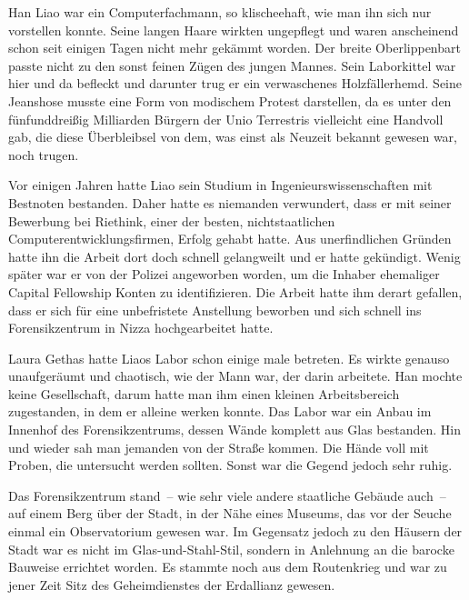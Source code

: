 Han Liao war ein Computerfachmann, so klischeehaft, wie man ihn sich nur vorstellen konnte. Seine langen Haare wirkten ungepflegt und waren anscheinend schon seit einigen Tagen nicht mehr gekämmt worden. Der breite Oberlippenbart passte nicht zu den sonst feinen Zügen des jungen Mannes. Sein Laborkittel war hier und da befleckt und darunter trug er ein verwaschenes Holzfällerhemd. Seine Jeanshose musste eine Form von modischem Protest darstellen, da es unter den fünfunddreißig Milliarden Bürgern der Unio Terrestris vielleicht eine Handvoll gab, die diese Überbleibsel von dem, was einst als Neuzeit bekannt gewesen war, noch trugen.

\par

Vor einigen Jahren hatte Liao sein Studium in Ingenieurswissenschaften mit Bestnoten bestanden. Daher hatte es niemanden verwundert, dass er mit seiner Bewerbung bei Riethink, einer der besten, nichtstaatlichen Computerentwicklungsfirmen, Erfolg gehabt hatte. Aus unerfindlichen Gründen hatte ihn die Arbeit dort doch schnell gelangweilt und er hatte gekündigt. Wenig später war er von der Polizei angeworben worden, um die Inhaber ehemaliger Capital Fellowship Konten zu identifizieren. Die Arbeit hatte ihm derart gefallen, dass er sich für eine unbefristete Anstellung beworben und sich schnell ins Forensikzentrum in Nizza hochgearbeitet hatte.

\par

Laura Gethas hatte Liaos Labor schon einige male betreten. Es wirkte genauso unaufgeräumt und chaotisch, wie der Mann war, der darin arbeitete. Han mochte keine Gesellschaft, darum hatte man ihm einen kleinen Arbeitsbereich zugestanden, in dem er alleine werken konnte. Das Labor war ein Anbau im Innenhof des Forensikzentrums, dessen Wände komplett aus Glas bestanden. Hin und wieder sah man jemanden von der Straße kommen. Die Hände voll mit Proben, die untersucht werden sollten. Sonst war die Gegend jedoch sehr ruhig.

\par

Das Forensikzentrum stand~-- wie sehr viele andere staatliche Gebäude auch~-- auf einem Berg über der Stadt, in der Nähe eines Museums, das vor der Seuche einmal ein Observatorium gewesen war. Im Gegensatz jedoch zu den Häusern der Stadt war es nicht im Glas-und-Stahl-Stil, sondern in Anlehnung an die barocke Bauweise errichtet worden. Es stammte noch aus dem Routenkrieg und war zu jener Zeit Sitz des Geheimdienstes der Erdallianz gewesen.

